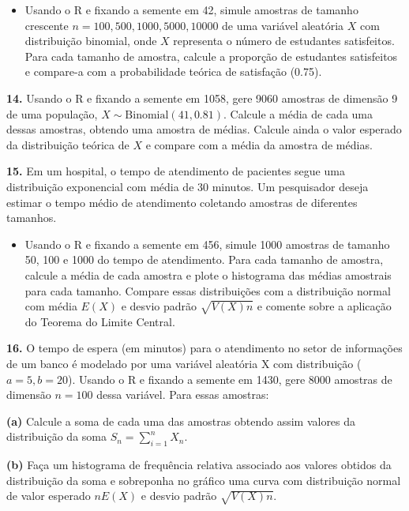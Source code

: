 \documentclass[
]{book}
\providecommand{\tightlist}{%
  \setlength{\itemsep}{0pt}\setlength{\parskip}{0pt}}
\begin{document}
\begin{itemize}
\tightlist
\item
  Usando o R e fixando a semente em 42, simule amostras de tamanho
  crescente \(n = 100, 500, 1000, 5000, 10000\) de uma variável
  aleatória \(X\) com distribuição binomial, onde \(X\) representa o
  número de estudantes satisfeitos. Para cada tamanho de amostra,
  calcule a proporção de estudantes satisfeitos e compare-a com a
  probabilidade teórica de satisfação (0.75).
\end{itemize}

\textbf{14.} Usando o R e fixando a semente em 1058, gere 9060 amostras de
dimensão 9 de uma população, \(X\sim \text{Binomial}(41,0.81)\). Calcule a
média de cada uma dessas amostras, obtendo uma amostra de médias.
Calcule ainda o valor esperado da distribuição teórica de \(X\) e compare
com a média da amostra de médias.

\textbf{15.} Em um hospital, o tempo de atendimento de pacientes segue uma
distribuição exponencial com média de 30 minutos. Um pesquisador deseja
estimar o tempo médio de atendimento coletando amostras de diferentes
tamanhos.

\begin{itemize}
\tightlist
\item
  Usando o R e fixando a semente em 456, simule 1000 amostras de
  tamanho 50, 100 e 1000 do tempo de atendimento. Para cada tamanho de
  amostra, calcule a média de cada amostra e plote o histograma das
  médias amostrais para cada tamanho. Compare essas distribuições com
  a distribuição normal com média \(E(X)\) e desvio padrão
  \(\sqrt{V(X)n}\) e comente sobre a aplicação do Teorema do Limite
  Central.
\end{itemize}

\textbf{16.} O tempo de espera (em minutos) para o atendimento no setor de
informações de um banco é modelado por uma variável aleatória X com
distribuição (\(a=5, b=20\)). Usando o R e fixando a
semente em 1430, gere 8000 amostras de dimensão \(n=100\) dessa variável.
Para essas amostras:

\textbf{(a)} Calcule a soma de cada uma das amostras obtendo assim valores da
distribuição da soma \(S_{n} = \sum_{i=1}^{n}X_{n}\).

\textbf{(b)} Faça um histograma de frequência relativa associado aos valores
obtidos da distribuição da soma e sobreponha no gráfico uma curva com
distribuição normal de valor esperado \(nE(X)\) e desvio padrão
\(\sqrt{V(X)n}\).
\end{document}
